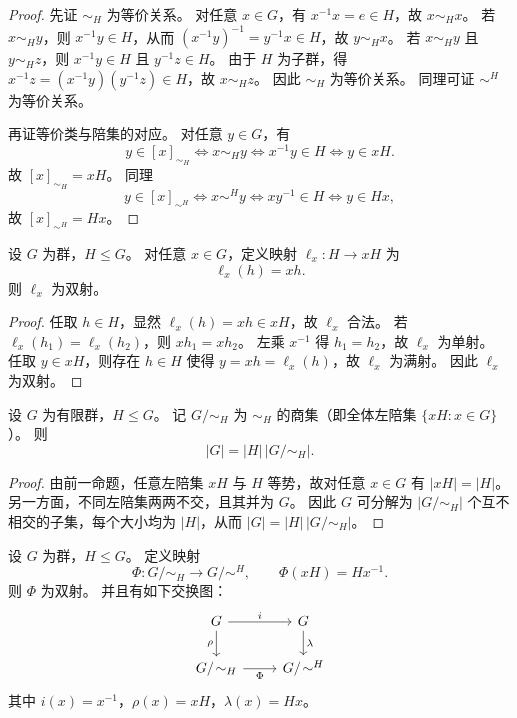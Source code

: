 \documentclass[lang=cn,a4paper,newtx]{elegantbook}
\begin{document}
\begin{proof}
先证 $\sim_H$ 为等价关系。
对任意 $x\in G$，有 $x^{-1}x=e\in H$，故 $x\sim_H x$。
若 $x\sim_H y$，则 $x^{-1}y\in H$，从而 $(x^{-1}y)^{-1}=y^{-1}x\in H$，故 $y\sim_H x$。
若 $x\sim_H y$ 且 $y\sim_H z$，则 $x^{-1}y\in H$ 且 $y^{-1}z\in H$。
由于 $H$ 为子群，得 $x^{-1}z=(x^{-1}y)(y^{-1}z)\in H$，故 $x\sim_H z$。
因此 $\sim_H$ 为等价关系。
同理可证 $\sim^{H}$ 为等价关系。

再证等价类与陪集的对应。
对任意 $y\in G$，有
\[
  y\in [x]_{\sim_H}\iff x\sim_H y\iff x^{-1}y\in H\iff y\in xH.
\]
故 $[x]_{\sim_H}=xH$。
同理
\[
  y\in [x]_{\sim^{H}}\iff x\sim^{H} y\iff xy^{-1}\in H\iff y\in Hx,
\]
故 $[x]_{\sim^{H}}=Hx$。
\end{proof}

\begin{proposition}
设 $G$ 为群，$H\le G$。
对任意 $x\in G$，定义映射 $\ell_x:H\to xH$ 为
\[
  \ell_x(h)=xh.
\]
则 $\ell_x$ 为双射。
\end{proposition}

\begin{proof}
任取 $h\in H$，显然 $\ell_x(h)=xh\in xH$，故 $\ell_x$ 合法。
若 $\ell_x(h_1)=\ell_x(h_2)$，则 $xh_1=xh_2$。
左乘 $x^{-1}$ 得 $h_1=h_2$，故 $\ell_x$ 为单射。
任取 $y\in xH$，则存在 $h\in H$ 使得 $y=xh=\ell_x(h)$，故 $\ell_x$ 为满射。
因此 $\ell_x$ 为双射。
\end{proof}

\begin{proposition}[拉格朗日定理]
设 $G$ 为有限群，$H\le G$。
记 $G/\!\sim_H$ 为 $\sim_H$ 的商集（即全体左陪集 $\{xH:x\in G\}$）。
则
\[
  |G|=|H|\,|G/\!\sim_H|.
\]
\end{proposition}

\begin{proof}
由前一命题，任意左陪集 $xH$ 与 $H$ 等势，故对任意 $x\in G$ 有 $|xH|=|H|$。
另一方面，不同左陪集两两不交，且其并为 $G$。
因此 $G$ 可分解为 $|G/\!\sim_H|$ 个互不相交的子集，每个大小均为 $|H|$，从而 $|G|=|H|\,|G/\!\sim_H|$。
\end{proof}

\begin{proposition}
设 $G$ 为群，$H\le G$。
定义映射
\[
  \Phi:G/\!\sim_H\to G/\!\sim^{H},\qquad \Phi(xH)=Hx^{-1}.
\]
则 $\Phi$ 为双射。
并且有如下交换图：
\[
\begin{tikzcd}
 G \arrow[r,"i"] \arrow[d,"\rho"'] & G \arrow[d,"\lambda"] \\
 G/\!\sim_H \arrow[r,"\Phi"'] & G/\!\sim^{H}
\end{tikzcd}
\]
其中 $i(x)=x^{-1}$，$\rho(x)=xH$，$\lambda(x)=Hx$。
\end{proposition}
\end{document}
